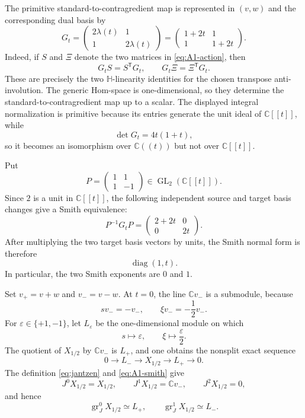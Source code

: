 \documentclass[11pt]{amsart}
\theoremstyle{definition}
\theoremstyle{remark}
\newcommand{\Hh}{\mathbb H}
\newcommand{\C}{\mathbb C}
\newcommand{\A}{\C[[t]]}
\newcommand{\K}{\C((t))}
\begin{document}
The primitive standard-to-contragredient map is represented in $(v,w)$ and
the corresponding dual basis by
\begin{equation}\label{eq:A1-intertwiner}
 G_t=
 \begin{pmatrix}2\lambda(t)&1\\1&2\lambda(t)\end{pmatrix}
 =\begin{pmatrix}1+2t&1\\1&1+2t\end{pmatrix}.
\end{equation}
Indeed, if $S$ and $\Xi$ denote the two matrices in
\eqref{eq:A1-action}, then
\[
 G_tS=S^{\mathsf T}G_t,
 \qquad
 G_t\Xi=\Xi^{\mathsf T}G_t.
\]
These are precisely the two $\Hh$-linearity identities for the chosen
transpose anti-involution.  The generic Hom-space is one-dimensional, so
they determine the standard-to-contragredient map up to a scalar.  The
displayed integral normalization is primitive because its entries generate
the unit ideal of $\A$, while
\[
 \det G_t=4t(1+t),
\]
so it becomes an isomorphism over $\K$ but not over $\A$.

\begin{samepage}
Put
\[
 P=\begin{pmatrix}1&1\\1&-1\end{pmatrix}\in\operatorname{GL}_2(\A).
\]
Since $2$ is a unit in $\A$, the following independent source and target
basis changes give a Smith equivalence:
\[
 P^{-1}G_tP
 =\begin{pmatrix}2+2t&0\\0&2t\end{pmatrix}.
\]
After multiplying the two target basis vectors by units, the Smith normal
form is therefore
\begin{equation}\label{eq:A1-smith}
 \operatorname{diag}(1,t).
\end{equation}
In particular, the two Smith exponents are $0$ and $1$.
\end{samepage}

Set $v_+=v+w$ and $v_-=v-w$.  At $t=0$, the line
$\mathbb Cv_-$ is a submodule, because
\[
 sv_-=-v_-,\qquad \xi v_-=-\frac12v_-.
\]
For $\varepsilon\in\{+1,-1\}$, let $L_\varepsilon$ be the one-dimensional
module on which
\[
 s\longmapsto\varepsilon,
 \qquad
 \xi\longmapsto\frac{\varepsilon}{2}.
\]
The quotient of $X_{1/2}$ by $\mathbb Cv_-$ is $L_+$, and one obtains the
nonsplit exact sequence
\[
 0\longrightarrow L_-
 \longrightarrow X_{1/2}
 \longrightarrow L_+\longrightarrow0.
\]
The definition \eqref{eq:jantzen} and \eqref{eq:A1-smith} give
\begin{equation}\label{eq:A1-layers}
 J^0X_{1/2}=X_{1/2},\qquad
 J^1X_{1/2}=\mathbb Cv_-,\qquad J^2X_{1/2}=0,
\end{equation}
and hence
\[
 \operatorname{gr}_J^0X_{1/2}\simeq L_+,
 \qquad
 \operatorname{gr}_J^1X_{1/2}\simeq L_-.
\]
\end{document}
